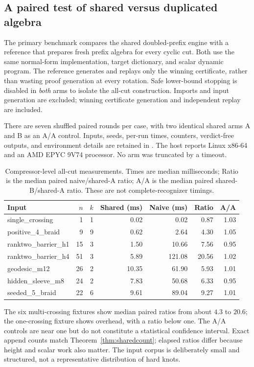\documentclass[11pt,a4paper]{article}
\theoremstyle{definition}\newtheorem{definition}[theorem]{Definition}
\theoremstyle{remark}\newtheorem{remark}[theorem]{Remark}
\newcommand{\code}[1]{\texttt{\detokenize{#1}}}
\begin{document}
\subsection{A paired test of shared versus duplicated algebra}
The primary benchmark compares the shared doubled-prefix engine with a
reference that prepares fresh prefix algebra for every cyclic cut. Both
use the same normal-form implementation, target dictionary, and scalar
dynamic program. The reference generates and replays only the winning
certificate, rather than wasting proof generation at every rotation.
Safe lower-bound stopping is disabled in \emph{both} arms to isolate the
all-cut construction. Imports and input generation are excluded; winning
certificate generation and independent replay are included.

There are seven shuffled paired rounds per case, with two identical shared
arms A and B as an A/A control. Inputs, seeds, per-run times, counters,
verdict-free outputs, and environment details are retained in
\code{data/benchmarks.json}. The host reports Linux x86-64 and an AMD EPYC
9V74 processor. No arm was truncated by a timeout.

\begin{table}[ht]\centering\small
\begin{tabular}{lrrrrrr}
\toprule
Input & $n$ & $k$ & Shared (ms) & Naive (ms) & Ratio & A/A \\
\midrule
single\_crossing & 1 & 1 & 0.02 & 0.02 & 0.87 & 1.03 \\
positive\_4\_braid & 9 & 9 & 0.62 & 2.64 & 4.30 & 1.05 \\
ranktwo\_barrier\_h1 & 15 & 3 & 1.50 & 10.66 & 7.56 & 0.95 \\
ranktwo\_barrier\_h4 & 51 & 3 & 5.89 & 121.08 & 20.56 & 1.02 \\
geodesic\_m12 & 26 & 2 & 10.35 & 61.90 & 5.93 & 1.01 \\
hidden\_sleeve\_m8 & 24 & 2 & 7.83 & 50.68 & 6.33 & 0.95 \\
seeded\_5\_braid & 22 & 6 & 9.61 & 89.04 & 9.27 & 1.01 \\
\bottomrule
\end{tabular}
\caption{Compressor-level all-cut measurements. Times are median milliseconds;
Ratio is the median paired naive/shared-A ratio; A/A is the median paired
shared-B/shared-A ratio. These are not complete-recognizer timings.}
\end{table}

The six multi-crossing fixtures show median paired ratios from about
$4.3$ to $20.6$; the one-crossing fixture shows overhead, with a ratio below
one. The A/A controls are near one but do not constitute a statistical
confidence interval. Exact append counts match
Theorem~\ref{thm:sharedcount}; elapsed ratios differ because height and scalar
work also matter. The input corpus is deliberately small and structured,
not a representative distribution of hard knots.
\end{document}
